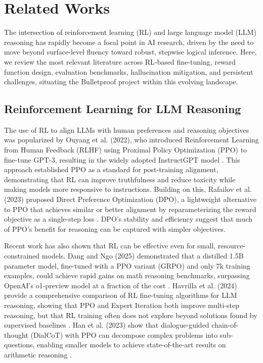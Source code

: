 
\section{Related Works}

The intersection of reinforcement learning (RL) and large language model (LLM) reasoning has rapidly become a focal point in AI research, driven by the need to move beyond surface-level fluency toward robust, stepwise logical inference. Here, we review the most relevant literature across RL-based fine-tuning, reward function design, evaluation benchmarks, hallucination mitigation, and persistent challenges, situating the Bulletproof project within this evolving landscape.

\subsection{Reinforcement Learning for LLM Reasoning}

The use of RL to align LLMs with human preferences and reasoning objectives was popularized by Ouyang et al. (2022), who introduced Reinforcement Learning from Human Feedback (RLHF) using Proximal Policy Optimization (PPO) to fine-tune GPT-3, resulting in the widely adopted InstructGPT model \citep{ouyang2022}. This approach established PPO as a standard for post-training alignment, demonstrating that RL can improve truthfulness and reduce toxicity while making models more responsive to instructions. Building on this, Rafailov et al. (2023) proposed Direct Preference Optimization (DPO), a lightweight alternative to PPO that achieves similar or better alignment by reparameterizing the reward objective as a single-step loss \citep{rafailov2023}. DPO's stability and efficiency suggest that much of PPO's benefit for reasoning can be captured with simpler objectives.

Recent work has also shown that RL can be effective even for small, resource-constrained models. Dang and Ngo (2025) demonstrated that a distilled 1.5B parameter model, fine-tuned with a PPO variant (GRPO) and only 7k training examples, could achieve rapid gains on math reasoning benchmarks, surpassing OpenAI's o1-preview model at a fraction of the cost \citep{dang2025}. Havrilla et al. (2024) provide a comprehensive comparison of RL fine-tuning algorithms for LLM reasoning, showing that PPO and Expert Iteration both improve multi-step reasoning, but that RL training often does not explore beyond solutions found by supervised baselines \citep{havrilla2024}. Han et al. (2023) show that dialogue-guided chain-of-thought (DialCoT) with PPO can decompose complex problems into sub-questions, enabling smaller models to achieve state-of-the-art results on arithmetic reasoning \citep{han2023}.

